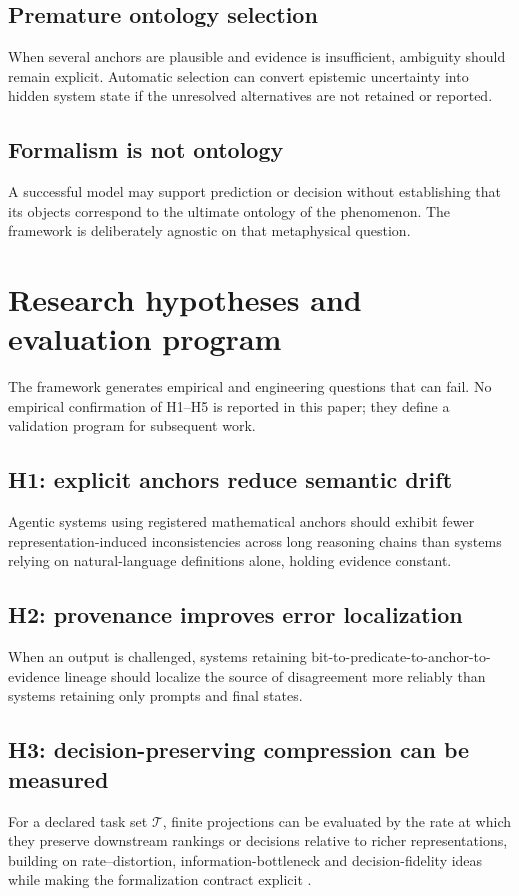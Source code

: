 \documentclass[11pt,a4paper]{article}
\begin{document}
\subsection{Premature ontology selection}
When several anchors are plausible and evidence is insufficient, ambiguity should remain explicit. Automatic selection can convert epistemic uncertainty into hidden system state if the unresolved alternatives are not retained or reported.

\subsection{Formalism is not ontology}
A successful model may support prediction or decision without establishing that its objects correspond to the ultimate ontology of the phenomenon. The framework is deliberately agnostic on that metaphysical question.

\section{Research hypotheses and evaluation program}\label{sec:evaluation}
The framework generates empirical and engineering questions that can fail. No empirical confirmation of H1--H5 is reported in this paper; they define a validation program for subsequent work.

\subsection{H1: explicit anchors reduce semantic drift}
Agentic systems using registered mathematical anchors should exhibit fewer representation-induced inconsistencies across long reasoning chains than systems relying on natural-language definitions alone, holding evidence constant.

\subsection{H2: provenance improves error localization}
When an output is challenged, systems retaining bit-to-predicate-to-anchor-to-evidence lineage should localize the source of disagreement more reliably than systems retaining only prompts and final states.

\subsection{H3: decision-preserving compression can be measured}
For a declared task set $\mathcal{T}$, finite projections can be evaluated by the rate at which they preserve downstream rankings or decisions relative to richer representations, building on rate--distortion, information-bottleneck and decision-fidelity ideas while making the formalization contract explicit \cite{shannon1959,tishby2000,blackwell1953,lee2026}.
\end{document}
